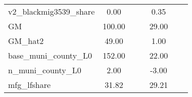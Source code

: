 \begin{table}[htbp]
\begin{tabular}{l*{2}{ccc}}
v2\_blackmig3539\_share&        0.00&            &            &        0.35&            &            \\
GM                  &      100.00&            &            &       29.00&            &            \\
GM\_hat2             &       49.00&            &            &        1.00&            &            \\
base\_muni\_county\_L0 &      152.00&            &            &       22.00&            &            \\
n\_muni\_county\_L0    &        2.00&            &            &       -3.00&            &            \\
mfg\_lfshare         &       31.82&            &            &       29.21&            &            \\
\bottomrule
\end{tabular}
\end{table}

